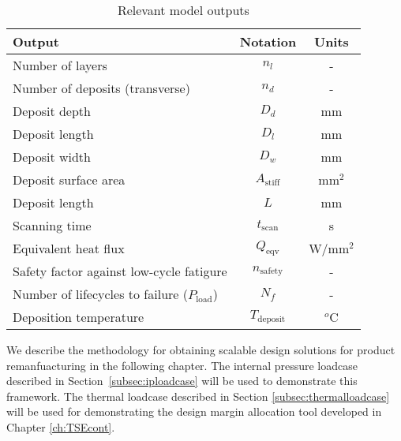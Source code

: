\begin{table}[h!]
	\centering
	\renewcommand{\arraystretch}{1.0}%
	\normalsize\addtolength{\tabcolsep}{-5pt}
	\caption{Relevant model outputs}
	\label{table:modeloutputs}
	\begin{tabular}{lcc}
	\hline\hline
	\bf Output    & \bf Notation & \bf Units \\ \hline
	Number of layers & $n_l$ & - \\
	Number of deposits (transverse) & $n_d$ & - \\
	Deposit depth  & $D_d$ & mm \\
	Deposit length  & $D_l$ & mm \\
	Deposit width  & $D_w$ & mm \\
	Deposit surface area  & $A_\textrm{stiff}$ & mm$^2$ \\
	Deposit length  & $L$ & mm \\
	Scanning time  & $t_\textrm{scan}$ & s \\
	Equivalent heat flux  & $Q_\textrm{eqv}$ & W/mm$^2$ \\
	Safety factor against low-cycle fatigure & $n_{\textrm{safety}}$ & - \\
	Number of lifecycles to failure (${P}_{\textrm{load}}$)& $N_f$ & - \\
	Deposition temperature & $T_\textrm{deposit}$ & $^o$C \\
	\hline\hline
	\end{tabular}
\end{table}

We describe the methodology for obtaining scalable design solutions for product remanfuacturing in the following chapter. The internal pressure loadcase described in Section~\ref{subsec:iploadcase} will be used to demonstrate this framework. The thermal loadcase described in Section \ref{subsec:thermalloadcase} will be used for demonstrating the design margin allocation tool developed in Chapter \ref{ch:TSEcont}.